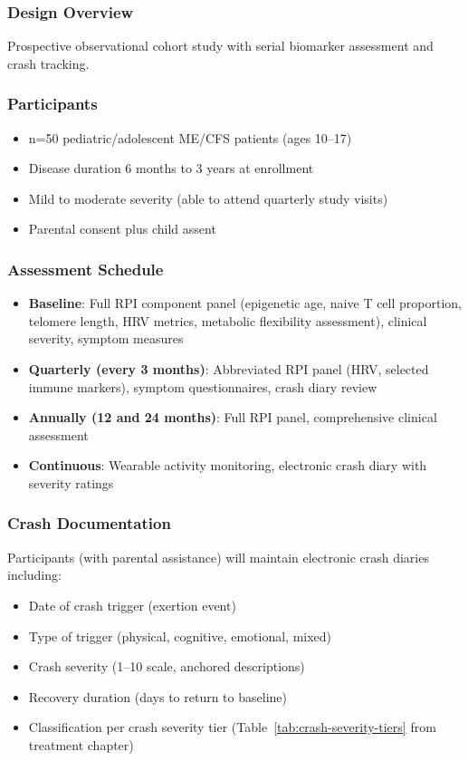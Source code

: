 \subsubsection{Design Overview}
Prospective observational cohort study with serial biomarker assessment and crash tracking.

\subsubsection{Participants}
\begin{itemize}
    \item n=50 pediatric/adolescent ME/CFS patients (ages 10--17)
    \item Disease duration 6 months to 3 years at enrollment
    \item Mild to moderate severity (able to attend quarterly study visits)
    \item Parental consent plus child assent
\end{itemize}

\subsubsection{Assessment Schedule}
\begin{itemize}
    \item \textbf{Baseline}: Full RPI component panel (epigenetic age, naive T cell proportion, telomere length, HRV metrics, metabolic flexibility assessment), clinical severity, symptom measures
    \item \textbf{Quarterly (every 3 months)}: Abbreviated RPI panel (HRV, selected immune markers), symptom questionnaires, crash diary review
    \item \textbf{Annually (12 and 24 months)}: Full RPI panel, comprehensive clinical assessment
    \item \textbf{Continuous}: Wearable activity monitoring, electronic crash diary with severity ratings
\end{itemize}

\subsubsection{Crash Documentation}
Participants (with parental assistance) will maintain electronic crash diaries including:
\begin{itemize}
    \item Date of crash trigger (exertion event)
    \item Type of trigger (physical, cognitive, emotional, mixed)
    \item Crash severity (1--10 scale, anchored descriptions)
    \item Recovery duration (days to return to baseline)
    \item Classification per crash severity tier (Table~\ref{tab:crash-severity-tiers} from treatment chapter)
\end{itemize}

